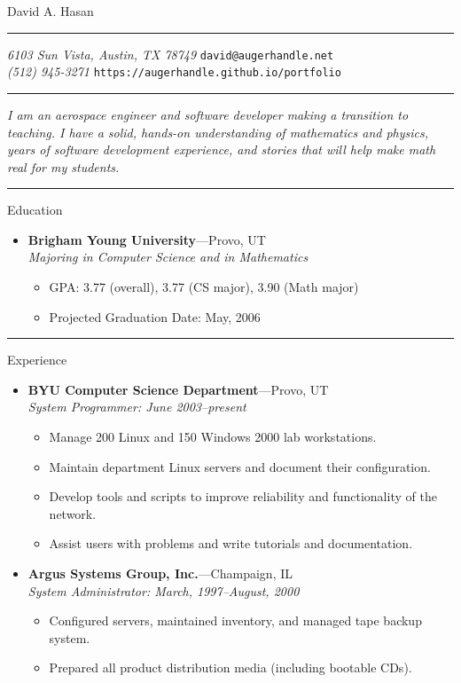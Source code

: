 \documentclass[11pt,oneside]{article}
\makeatletter
\newcommand{\name}{David A. Hasan}
\newcommand{\addr}{6103 Sun Vista, Austin, TX 78749}
\newcommand{\phone}{(512) 945-3271}
\newcommand{\email}{david@augerhandle.net}
\newcommand{\web}{https://augerhandle.github.io/portfolio}
\newcommand{\resheader}{
	\begin{center}
		\Huge\name
	\end{center}

	\vspace{-8pt} \rule{\textwidth}{0.25pt}
	\vspace{-8pt}
	{\small \textit{\addr} \hfill \texttt{\email}}\\
	{\vskip -6pt}{\small \textit{\phone} \hfill \texttt{\web}}
	{\vskip -6pt}\rule{\textwidth}{0.5pt}
}
\newcommand{\resabstract}[1]{
	\begin{changemargin}{1in}{1in}
		\textit{#1}
	\end{changemargin}
}
\newenvironment{ressection}[1]{
	\rule{\textwidth}{0.25pt}	\vspace{4pt}
	{\fontfamily{phv}\selectfont\Large#1}
	\begin{itemize}
	\vspace{3pt}
}{
	\end{itemize}
}
\newcommand{\ressubitem}[1]{
	\vspace{-1pt}
	\item \begin{flushleft} #1 \end{flushleft}
}
\newcommand{\resbigitem}[3]{
	\vspace{-5pt}
	\item
	\textbf{#1}---#2 \\
	\textit{#3}
}
\newenvironment{ressubsec}[3]{
	\resbigitem{#1}{#2}{#3}
	\vspace{-2pt}
	\begin{itemize}
}{
	\end{itemize}
}
\makeatother
\begin{document}
 \selectfont

\resheader

\resabstract{%
	I am an aerospace engineer and software developer making
	a transition to teaching.
	I have a solid, hands-on understanding of mathematics
	and physics, years of software development experience,
	and stories that will help make math real for my students.
}

\begin{ressection}{Education}

	\begin{ressubsec}{Brigham Young University}{Provo, UT}{Majoring in Computer Science and in Mathematics}
		\ressubitem{GPA: 3.77 (overall), 3.77 (CS major), 3.90 (Math major)}
		\ressubitem{Projected Graduation Date: May, 2006}
	\end{ressubsec}

\end{ressection}


\begin{ressection}{Experience}

	\begin{ressubsec}{BYU Computer Science Department}{Provo, UT}{System Programmer: June 2003--present}
		\ressubitem{Manage 200 Linux and 150 Windows 2000 lab workstations.}
		\ressubitem{Maintain department Linux servers and document their configuration.}
		\ressubitem{Develop tools and scripts to improve reliability and functionality of the network.}
		\ressubitem{Assist users with problems and write tutorials and documentation.}
	\end{ressubsec}

	\begin{ressubsec}{Argus Systems Group, Inc.}{Champaign, IL}{System Administrator: March, 1997--August, 2000}
		\ressubitem{Configured servers, maintained inventory, and managed tape backup system.}
		\ressubitem{Prepared all product distribution media (including bootable CDs).}
	\end{ressubsec}

\end{ressection}
\end{document}
